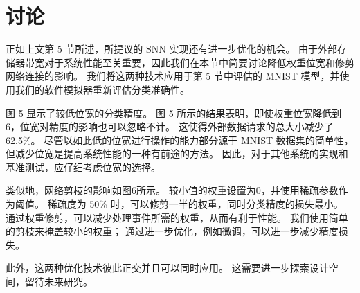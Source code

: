 

\chapter{讨论}

正如上文第 5 节所述，所提议的 SNN 实现还有进一步优化的机会。 
由于外部存储器带宽对于系统性能至关重要，因此我们在本节中简要讨论降低权重位宽和修剪网络连接的影响。 
我们将这两种技术应用于第 5 节中评估的 MNIST 模型，并使用我们的软件模拟器重新评估分类准确性。

图 5 显示了较低位宽的分类精度。
图 5 所示的结果表明，即使权重位宽降低到 6，位宽对精度的影响也可以忽略不计。
这使得外部数据请求的总大小减少了 62.5\%。 
尽管以如此低的位宽进行操作的能力部分源于 MNIST 数据集的简单性，但减少位宽是提高系统性能的一种有前途的方法。
因此，对于其他系统的实现和基准测试，应仔细考虑位宽的选择。

类似地，网络剪枝的影响如图6所示。
较小值的权重设置为0，并使用稀疏参数作为阈值。
稀疏度为 50\% 时，可以修剪一半的权重，同时分类精度的损失最小。
通过权重修剪，可以减少处理事件所需的权重，从而有利于性能。
我们使用简单的剪枝来掩盖较小的权重； 通过进一步优化，例如微调，可以进一步减少精度损失。

此外，这两种优化技术彼此正交并且可以同时应用。
这需要进一步探索设计空间，留待未来研究。
